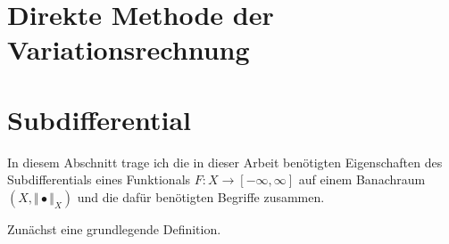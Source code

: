 % 
% 
% 
% 

\section{Direkte Methode der Variationsrechnung}

\section{Subdifferential}
In diesem Abschnitt trage ich die in dieser Arbeit benötigten Eigenschaften 
des Subdifferentials eines Funktionals $F:X\to [-\infty,\infty]$ 
auf einem Banachraum 
$(X,\Vert\bullet\Vert_X)$ und die dafür benötigten Begriffe zusammen.

Zunächst eine grundlegende Definition.

